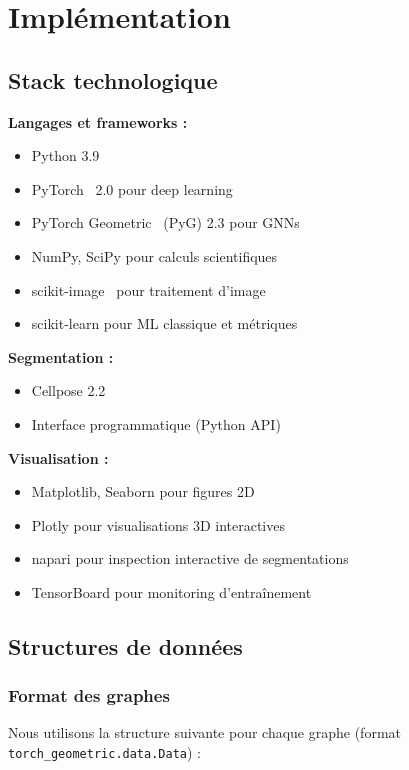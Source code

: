 \section{Implémentation}

\subsection{Stack technologique}

\textbf{Langages et frameworks :}
\begin{itemize}
    \item Python 3.9
    \item PyTorch~\cite{Paszke2019} 2.0 pour deep learning
    \item PyTorch Geometric~\cite{Fey2019} (PyG) 2.3 pour GNNs
    \item NumPy, SciPy pour calculs scientifiques
    \item scikit-image~\cite{VanDerWalt2014} pour traitement d'image
    \item scikit-learn pour ML classique et métriques
\end{itemize}

\textbf{Segmentation :}
\begin{itemize}
    \item Cellpose 2.2
    \item Interface programmatique (Python API)
\end{itemize}

\textbf{Visualisation :}
\begin{itemize}
    \item Matplotlib, Seaborn pour figures 2D
    \item Plotly pour visualisations 3D interactives
    \item napari pour inspection interactive de segmentations
    \item TensorBoard pour monitoring d'entraînement
\end{itemize}

\subsection{Structures de données}

\subsubsection{Format des graphes}

Nous utilisons la structure suivante pour chaque graphe (format \texttt{torch\allowbreak\_\allowbreak geometric.\allowbreak data.\allowbreak Data}) :

